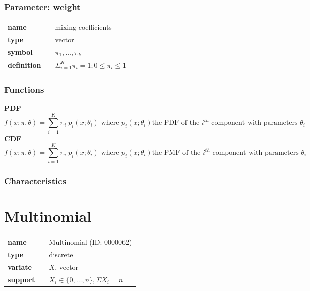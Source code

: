 \subsubsection*{Parameter: weight}

\noindent\begin{tabular}{p{2cm}cl}
\textbf{name} & & mixing coefficients \\
\textbf{type} & & vector \\
\textbf{symbol} & & $\pi_1, \ldots, \pi_k$  \\
\textbf{definition} & & $\Sigma_{i=1}^K \pi_i=1; 0\le \pi_i \le 1$
\end{tabular}
\subsubsection*{Functions}

\smallskip \noindent \hspace{.2cm} \textbf{PDF} 
\begin{equation*}f(x; \pi, \theta) = \sum_{i=1}^{K} \pi_{i}\; p_i(x; \theta_i) \text{ where } p_i(x; \theta_i) \text{the PDF of the } i^{th} \text{ component with parameters } \theta_i\end{equation*}
\smallskip \noindent \hspace{.2cm} \textbf{CDF} 
\begin{equation*}f(x; \pi, \theta) = \sum_{i=1}^{K} \pi_{i}\; p_i(x; \theta_i) \text{ where } p_i(x; \theta_i) \text{the PMF of the } i^{th} \text{ component with parameters } \theta_i\end{equation*}
\smallskip
\subsubsection*{Characteristics}
\smallskip
\section*{Multinomial} 

  \bigskip 

\begin{tabular}{p{2cm}cl}
\textbf{name} & & Multinomial (ID: 0000062)\\ 
 
\textbf{type} & & discrete \\ 

\textbf{variate} & & $X$, vector \\ 

\textbf{support} & & $X_i \in \{0,\dots,n\}, \Sigma X_i = n$
\end{tabular}

